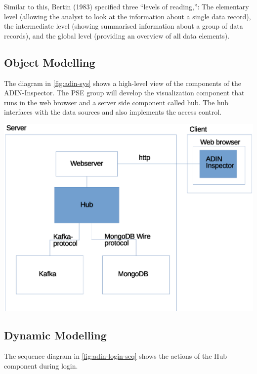 \documentclass[twoside, english, final]{Pflichtenheft}
\begin{document}
Similar to this, Bertin (1983) specified three “levels of reading,”:
The elementary level (allowing the analyst to look at the information about a
single data record), the intermediate level (showing summarised information about a group of data records), and the global level (providing an overview of all data elements).

\subsection{Object Modelling}

The diagram in \autoref{fig:adin-sys} shows a high-level view of the components of the ADIN-Inspector. The PSE group will develop the visualization component that runs in the web browser and a server side component called hub. The hub interfaces with the data sources and also implements the access control.

\begin{center}
	\includegraphics[scale=0.8]{Images/adin-sys1d.eps}
	\label{fig:adin-sys}
\end{center}


\subsection{Dynamic Modelling}

The sequence diagram in \autoref{fig:adin-login-seq} shows the actions of the Hub component during login.
\end{document}

